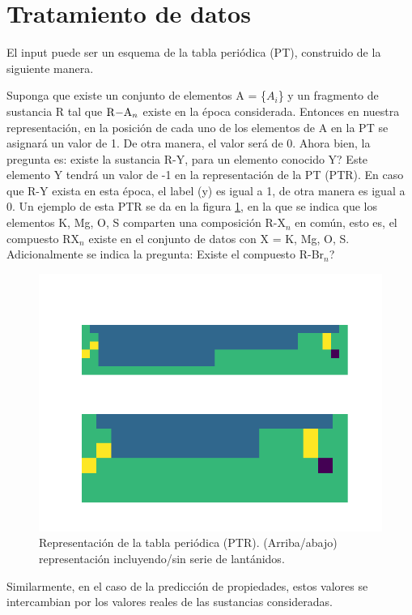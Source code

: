 \documentclass[twoside,twocolumn]{article}
\begin{document}
\section{Tratamiento de datos}
\label{sec:sec2}

El input puede ser un esquema de la tabla peri\'odica (PT), construido de la siguiente manera.

Suponga que existe un conjunto de elementos A = \{$A_i$\} y un fragmento de sustancia R tal que $\ce{R-A_n}$ existe en la \'epoca considerada. Entonces en nuestra representaci\'on, en la posici\'on de cada uno de los elementos de A en la PT se asignar\'a un valor de 1. De otra manera, el valor ser\'a de 0. Ahora bien, la pregunta es: existe la sustancia R-Y, para un elemento conocido Y? 
Este elemento Y tendr\'a un valor de -1 en la representaci\'on de la PT (PTR).
En caso que R-Y exista en esta \'epoca, el label (y) es igual a 1, de otra manera es igual a 0. Un ejemplo de esta PTR se da en la figura \ref{fig:fig1}, en la que se indica que los elementos K, Mg, O, S comparten una composici\'on R-X$_n$ en com\'un, esto es, el compuesto RX$_n$ existe en el conjunto de datos con X = K, Mg, O, S. Adicionalmente se indica la pregunta: Existe el compuesto R-Br$_n$?

\begin{figure}[h!]
	\includegraphics[width=\linewidth]{ex1TPR.png}
	\caption{Representaci\'on de la tabla peri\'odica (PTR). (Arriba/abajo) representaci\'on incluyendo/sin serie de lant\'anidos.}
	\label{fig:fig1}
\end{figure}

Similarmente, en el caso de la predicci\'on de propiedades, estos valores se intercambian por los valores reales de las sustancias consideradas.
\end{document}
